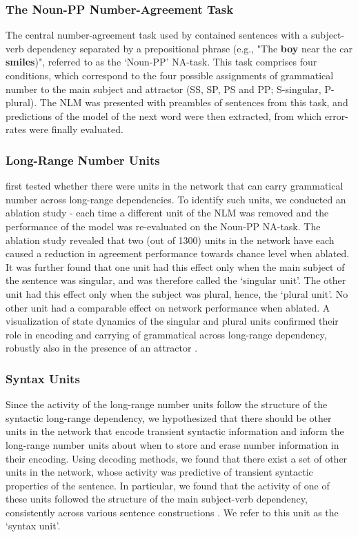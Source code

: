 \subsubsection{The Noun-PP Number-Agreement Task}
The central number-agreement task used by \citet{lakretz2019emergence} contained sentences with a subject-verb dependency separated by a prepositional phrase (e.g., "The \textbf{boy} near the car \textbf{smiles})", referred to as the `Noun-PP' NA-task. 
This task comprises four conditions, which correspond to the four possible assignments of grammatical number to the main subject and attractor (SS, SP, PS and PP; S-singular, P-plural). The NLM was presented with preambles of sentences from this task, and predictions of the model of the next word were then extracted, from which error-rates were finally evaluated. 

\subsubsection{Long-Range Number Units}
\citet{lakretz2019emergence} first tested whether there were units in the network that can carry grammatical number across long-range dependencies. 
To identify such units, we conducted an ablation study - each time a different unit of the NLM was removed and the performance of the model was re-evaluated on the Noun-PP NA-task. 
The ablation study revealed that two (out of 1300) units in the network have each caused a reduction in agreement performance towards chance level when ablated. It was further found that one unit had this effect only when the main subject of the sentence was singular, and was therefore called the `singular unit'. 
The other unit had this effect only when the subject was plural, hence, the `plural unit'. 
No other unit had a comparable effect on network performance when ablated. A visualization of state dynamics of the singular and plural units confirmed their role in encoding and carrying of grammatical across long-range dependency, robustly also in the presence of an attractor \citep[figure 1 in][]{lakretz2019emergence}.

\subsubsection{Syntax Units}
Since the activity of the long-range number units follow the structure of the syntactic long-range dependency, we hypothesized that there should be other units in the network that encode transient syntactic information and inform the long-range number units about when to store and erase number information in their encoding. 
Using decoding methods, we found that there exist a set of other units in the network, whose activity was predictive of transient syntactic properties of the sentence. 
In particular, we found that the activity of one of these units followed the structure of the main subject-verb dependency, consistently across various sentence constructions \citep[figure 3 in][]{lakretz2019emergence}. 
We refer to this unit as the `syntax unit'.

